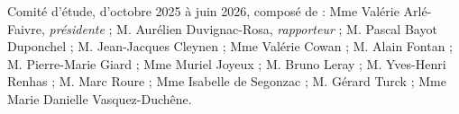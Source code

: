Comité d'étude, d'octobre 2025 à juin 2026, composé de : Mme Valérie Arlé-Faivre, \textit{présidente} ; M. Aurélien Duvignac-Rosa, \textit{rapporteur} ; M. Pascal Bayot Duponchel ; M. Jean-Jacques Cleynen ; Mme Valérie Cowan ; M. Alain Fontan ; M. Pierre-Marie Giard ; Mme Muriel Joyeux ; M. Bruno Leray ; M. Yves-Henri Renhas ; M. Marc Roure ; Mme Isabelle de Segonzac ; M. Gérard Turck ; Mme Marie Danielle Vasquez-Duchêne.